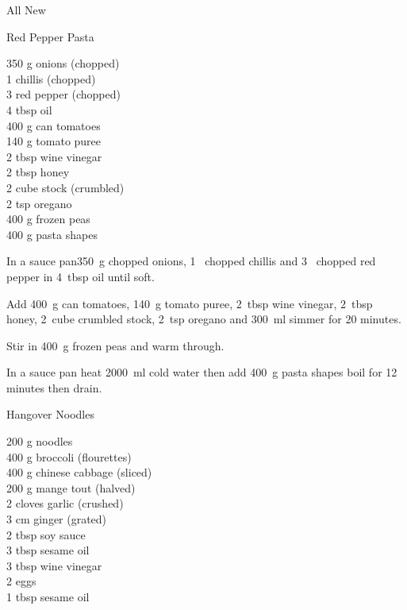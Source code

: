 \begin{menu}{All New}
\begin{recipe}{2}{Red Pepper Pasta}
		\begin{ingredients}
		350 g onions (chopped) \\
	1  chillis (chopped) \\
	3  red pepper (chopped) \\
	4 tbsp oil  \\
	400 g can tomatoes  \\
	140 g tomato puree  \\
	2 tbsp wine vinegar  \\
	2 tbsp honey  \\
	2 cube stock (crumbled) \\
	2 tsp oregano  \\
	400 g frozen peas  \\
	400 g pasta shapes  \\
	
		\end{ingredients}
	
    \begin{instructions}
    \item 
        In a sauce pan350~g chopped onions,
        1~ chopped chillis
        and
        3~ chopped red pepper
        in
        4~tbsp  oil
        until soft.
      \item 
        Add
        400~g  can tomatoes,
        140~g  tomato puree,
        2~tbsp  wine vinegar,
        2~tbsp  honey,        
        2~cube crumbled stock,
        2~tsp  oregano
        and
        300~ml  
        simmer for 20 minutes.
      \item 
        Stir in
        400~g  frozen peas
        and warm through.
      \item 
      In a sauce pan heat
      2000~ml  cold water then add
      400~g  pasta shapes
      boil for 12
      minutes then drain.
    
    \end{instructions}
    \end{recipe}%
  
    \begin{recipe}{1}{Hangover Noodles}%
    
		\begin{ingredients}
		200 g noodles  \\
	400 g broccoli (flourettes) \\
	400 g chinese cabbage (sliced) \\
	200 g mange tout (halved) \\
	2 cloves garlic (crushed) \\
	3 cm ginger (grated) \\
	2 tbsp soy sauce  \\
	3 tbsp sesame oil  \\
	3 tbsp wine vinegar  \\
	2  eggs  \\
	1 tbsp sesame oil  \\
	

\end{ingredients}
\end{recipe}
\end{menu}
